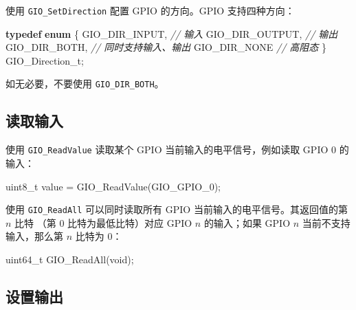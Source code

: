 \documentclass[
  12pt,
]{book}
\makeatletter
\newenvironment{Shaded}{\begin{snugshade}}{\end{snugshade}}
\newcommand{\CommentTok}[1]{\textcolor[rgb]{0.56,0.35,0.01}{\textit{#1}}}
\newcommand{\DataTypeTok}[1]{\textcolor[rgb]{0.13,0.29,0.53}{#1}}
\newcommand{\KeywordTok}[1]{\textcolor[rgb]{0.13,0.29,0.53}{\textbf{#1}}}
\newcommand{\NormalTok}[1]{#1}
\newenvironment{kframe}{%
\medskip{}
\setlength{\fboxsep}{.8em}
 \def\at@end@of@kframe{}%
 \ifinner\ifhmode%
  \def\at@end@of@kframe{\end{minipage}}%
  \begin{minipage}{\columnwidth}%
 \fi\fi%
 \def\FrameCommand##1{\hskip\@totalleftmargin \hskip-\fboxsep
 \colorbox{shadecolor}{##1}\hskip-\fboxsep
     \hskip-\linewidth \hskip-\@totalleftmargin \hskip\columnwidth}%
 \MakeFramed {\advance\hsize-\width
   \@totalleftmargin\z@ \linewidth\hsize
   \@setminipage}}%
 {\par\unskip\endMakeFramed%
 \at@end@of@kframe}
\newenvironment{rmdblock}[1]
  {
  \begin{itemize}
  \renewcommand{\labelitemi}{
    \raisebox{-.7\height}[0pt][0pt]{
      {\setkeys{Gin}{width=3em,keepaspectratio}\texttt{[image: images/\#1]}}
    }
  }
  \setlength{\fboxsep}{1em}
  \begin{kframe}
  \item
  }
  {
  \end{kframe}
  \end{itemize}
  }
\newenvironment{rmdcaution}
  {\begin{rmdblock}{caution}}
  {\end{rmdblock}}
\makeatother
\begin{document}
使用 \texttt{GIO\_SetDirection} 配置 GPIO 的方向。GPIO 支持四种方向：

\begin{Shaded}
\begin{Highlighting}[]
\KeywordTok{typedef} \KeywordTok{enum}
\NormalTok{\{}
\NormalTok{    GIO_DIR_INPUT,  }\CommentTok{// 输入}
\NormalTok{    GIO_DIR_OUTPUT, }\CommentTok{// 输出}
\NormalTok{    GIO_DIR_BOTH,   }\CommentTok{// 同时支持输入、输出}
\NormalTok{    GIO_DIR_NONE    }\CommentTok{// 高阻态}
\NormalTok{\} GIO_Direction_t;}
\end{Highlighting}
\end{Shaded}

\begin{rmdcaution}
如无必要，不要使用 \texttt{GIO\_DIR\_BOTH}。
\end{rmdcaution}

\hypertarget{ux8bfbux53d6ux8f93ux5165}{%
\subsection{读取输入}\label{ux8bfbux53d6ux8f93ux5165}}

使用 \texttt{GIO\_ReadValue} 读取某个 GPIO 当前输入的电平信号，例如读取 GPIO 0 的输入：

\begin{Shaded}
\begin{Highlighting}[]
\DataTypeTok{uint8_t}\NormalTok{ value = GIO_ReadValue(GIO_GPIO_0);}
\end{Highlighting}
\end{Shaded}

使用 \texttt{GIO\_ReadAll} 可以同时读取所有 GPIO 当前输入的电平信号。其返回值的第 \(n\) 比特
（第 0 比特为最低比特）对应 GPIO \(n\) 的输入；如果 GPIO \(n\) 当前不支持输入，那么第 \(n\)
比特为 0：

\begin{Shaded}
\begin{Highlighting}[]
\DataTypeTok{uint64_t}\NormalTok{ GIO_ReadAll(}\DataTypeTok{void}\NormalTok{);}
\end{Highlighting}
\end{Shaded}

\hypertarget{ux8bbeux7f6eux8f93ux51fa}{%
\subsection{设置输出}\label{ux8bbeux7f6eux8f93ux51fa}}
\end{document}
